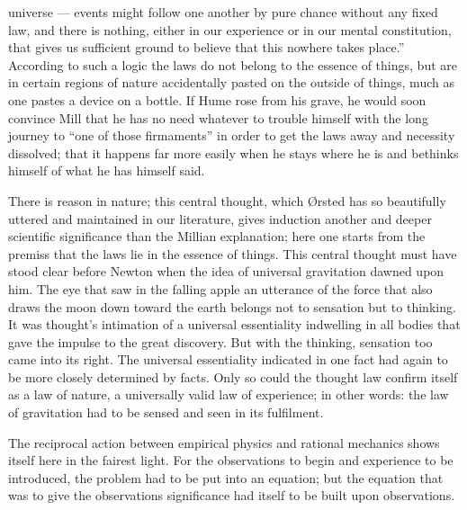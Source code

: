\documentclass[12pt,a4paper]{book}
\begin{document}
universe --- events might follow one another by pure chance without any fixed law, and
there is nothing, either in our experience or in our mental constitution, that gives us
sufficient ground to believe that this nowhere takes place.'' According to such a
logic the laws do not belong to the essence of things, but are in certain regions of
nature accidentally pasted on the outside of things, much as one pastes a device on a
bottle. If Hume rose from his grave, he would soon convince Mill that he has no need
whatever to trouble himself with the long journey to ``one of those firmaments'' in
order to get the laws away and necessity dissolved;
that it happens far more easily when he stays where he is and bethinks himself of what
he has himself said.

There is reason in nature; this central thought, which Ørsted has so beautifully uttered
and maintained in our literature, gives induction another and deeper scientific
significance than the Millian explanation; here one starts from the premiss that the
laws lie in the essence of things. This central thought must have stood clear before
Newton when the idea of universal gravitation dawned upon him. The eye that saw in the
falling apple an utterance of the force that also draws the moon down toward the earth
belongs not to sensation but to thinking. It was thought's intimation of a universal
essentiality indwelling in all bodies that gave the impulse to the great discovery. But
with the thinking, sensation too came into its right. The universal essentiality
indicated in one fact had again to be more closely determined by facts. Only so could
the thought law confirm itself as a law of nature, a universally valid law of
experience; in other words: the law of gravitation had to be sensed and seen in its
fulfilment.

The reciprocal action between empirical physics and rational mechanics shows itself
here in the fairest light. For the observations to begin and experience to be
introduced, the problem had to be put into an equation; but the equation that was to
give the observations significance had itself to be built upon observations.
\end{document}

